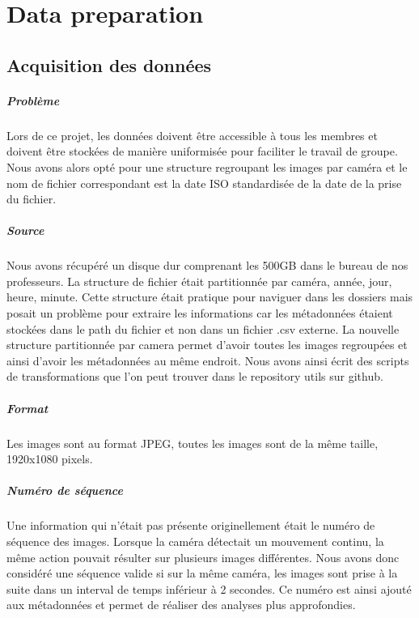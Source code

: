 \chapter{Data preparation}

\section{Acquisition des données}

\paragraph*{Problème} Lors de ce projet, les données doivent être accessible à tous les membres et doivent être stockées de manière uniformisée pour faciliter le travail de groupe. Nous avons alors opté pour une structure regroupant les images par caméra et le nom de fichier correspondant est la date ISO standardisée de la date de la prise du fichier.

\paragraph*{Source} Nous avons récupéré un disque dur comprenant les 500GB dans le bureau de nos professeurs. La structure de fichier était partitionnée par caméra, année, jour, heure, minute. Cette structure était pratique pour naviguer dans les dossiers mais posait un problème pour extraire les informations car les métadonnées étaient stockées dans le path du fichier et non dans un fichier .csv externe. La nouvelle structure partitionnée par camera permet d'avoir toutes les images regroupées et ainsi d'avoir les métadonnées au même endroit. Nous avons ainsi écrit des scripts de transformations que l'on peut trouver dans le repository utils sur github.

\paragraph*{Format} Les images sont au format JPEG, toutes les images sont de la même taille, 1920x1080 pixels.

\paragraph*{Numéro de séquence} Une information qui n'était pas présente originellement était le numéro de séquence des images. Lorsque la caméra détectait un mouvement continu, la même action pouvait résulter sur plusieurs images différentes. Nous avons donc considéré une séquence valide si sur la même caméra, les images sont prise à la suite dans un interval de temps inférieur à 2 secondes. Ce numéro est ainsi ajouté aux métadonnées et permet de réaliser des analyses plus approfondies.

